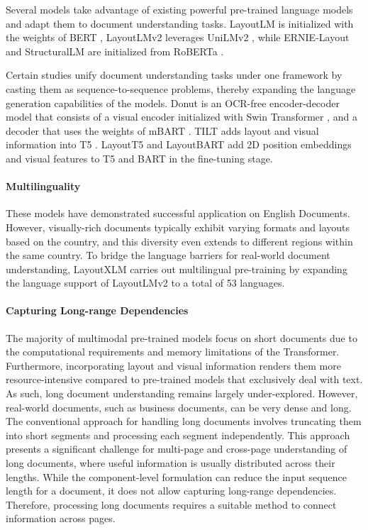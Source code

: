 Several models take advantage of existing powerful pre-trained language models and adapt them to document understanding tasks. LayoutLM \citep{xu2020layoutlm} is initialized with the weights of \ac{BERT} \citep{devlin2018bert}, LayoutLMv2 \citep{xu2020layoutlmv2} leverages UniLMv2 \citep{bao2020unilmv2}, while ERNIE-Layout \citep{peng2022ernie} and StructuralLM \citep{li2021structurallm} are initialized from RoBERTa \citep{liu2019roberta}.

Certain studies unify document understanding tasks under one framework by casting them as sequence-to-sequence problems, thereby expanding the language generation capabilities of the models. Donut \citep{kim2022ocr} is an \ac{OCR}-free encoder-decoder model that consists of a visual encoder initialized with Swin Transformer \citep{liu2021swin}, and a decoder that uses the weights of mBART \citep{liu2020multilingual}. TILT \citep{powalski2021going} adds layout and visual information into \ac{T5} \citep{raffel2020exploring}. LayoutT5 and LayoutBART \citep{tanaka2021visualmrc} add 2D position embeddings and visual features to \ac{T5} and \ac{BART} \citep{lewis2019bart} in the fine-tuning stage.

\paragraph{Multilinguality} 

These models have demonstrated successful application on English Documents. However, visually-rich documents typically exhibit varying formats and layouts based on the country, and this diversity even extends to different regions within the same country. To bridge the language barriers for real-world document understanding, LayoutXLM \citep{xu2021layoutxlm} carries out multilingual pre-training by expanding the language support of LayoutLMv2 to a total of 53 languages.

\paragraph{Capturing Long-range Dependencies}

The majority of multimodal pre-trained models focus on short documents due to the computational requirements and memory limitations of the Transformer. Furthermore, incorporating layout and visual information renders them more resource-intensive compared to pre-trained models that exclusively deal with text. As such, long document understanding remains largely under-explored. However, real-world documents, such as business documents, can be very dense and long. The conventional approach for handling long documents involves truncating them into short segments and processing each segment independently. This approach presents a significant challenge for multi-page and cross-page understanding of long documents, where useful information is usually distributed across their lengths. While the component-level formulation \citep{li2021structurallm, li2021selfdoc} can reduce the input sequence length for a document, it does not allow capturing long-range dependencies. Therefore, processing long documents requires a suitable method to connect information across pages.

